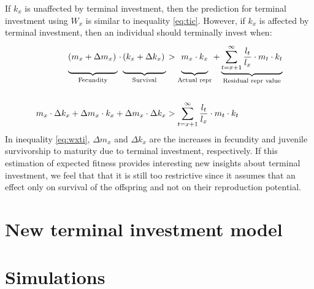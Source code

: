 \documentclass[12pt,review,authoryear]{elsarticle}
\begin{document}
If $k_x$ is unaffected by terminal investment, then the prediction for terminal investment using $W_{x}$ is similar to inequality \eqref{eq:tic}. However, if $k_x$ is affected by terminal investment, then an individual should terminally invest when:
\begin{equation}\label{eq:wxti}
\begin{split}
\def\tallest{\vphantom{\sum_{1}^{1} \frac{1}{1}}}
\underbrace{\left(m_{x} + \Delta m_{x}\right)\tallest}_{\text{Fecundity}} \cdot 
\underbrace{\left(k_{x} + \Delta k_{x}\right)\tallest}_{\text{Survival}} &> 
\def\tallest{\vphantom{\sum_{1}^{1} \frac{1}{1}}}
\underbrace{ m_{x} \cdot k_{x}\tallest }_{\text{Actual repr}} + 
\underbrace{ \sum_{t= x + 1}^{\infty} \frac{l_t}{l_x} \cdot m_t \cdot k_t}_{\text{Residual repr value}}
 \\ \\ 
m_x \cdot \Delta k_{x} + \Delta m_{x} \cdot k_x + \Delta m_{x} \cdot \Delta k_{x} &> \sum_{t= x + 1}^{\infty} \frac{l_t}{l_x} \cdot m_t \cdot k_t
\end{split}
\end{equation}
In inequality \ref{eq:wxti}, $\Delta m_{x}$ and $\Delta k_{x}$ are the increases in fecundity and juvenile survivorship to maturity due to terminal investment, respectively. If this estimation of expected fitness provides interesting new insights about terminal investment, we feel that that it is still too restrictive since it assumes that an effect only on survival of the offspring and not on their reproduction potential.



\section{New terminal investment model}





\section{Simulations}
\end{document}
